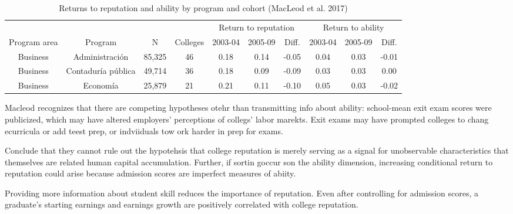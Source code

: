 \documentclass[a4paper, 11pt]{article}
\begin{document}
\begin{table}[h!]
 \begin{adjustwidth}{-.75in}{-.75in} 
 \begin{center}
 \caption{Returns to reputation and ability by program and cohort (MacLeod et al. 2017)}
 \vspace{8pt}
\begin{tabular}{cccccccccc}
\toprule
             &                    &        &          & \multicolumn{3}{c}{Return to reputation}&\multicolumn{3}{c}{Return to ability}       \\
             \cmidrule(lr){5-7} \cmidrule(lr){8-10}
Program area & Program            & N      & Colleges & 2003-04              & 2005-09 & Diff. & 2003-04           & 2005-09 & Diff. \\
\midrule
Business     & Administraci\'on     & 85,325 & 46       & 0.18                 & 0.14    & -0.05 & 0.04              & 0.03    & -0.01 \\
Business     & Contadur\'ia p\'ublica & 49,714 & 36       & 0.18                 & 0.09    & -0.09 & 0.03              & 0.03    & 0.00  \\
Business     & Econom\'ia           & 25,879 & 21       & 0.21                 & 0.11    & -0.10 & 0.05              & 0.03    & -0.02 \\
\bottomrule
\end{tabular}
\label{tab:macleod}
\end{center}
\end{adjustwidth}
\end{table}


Macleod recognizes that there are competing hypotheses otehr than transmitting info about ability:
 school-mean exit exam scores were publicized, which may have altered employers' perceptions of collegs' labor marekts. Exit exams may have prompted colleges to chang ecurricula or add teest prep, or indviiduals tow ork harder in prep for exams. 
 

 
 Conclude that they cannot rule out the hypotehsis that college reputation is merely serving as a signal for unobservable characteristics that themselves are related human capital accumulation.  Further, if sortin goccur son the ability dimension, increasing conditional return to reputation could arise because admission scores are imperfect measures of abiity. 
 
 Providing more information about student skill reduces the importance of reputation.  Even after controlling for admission scores, a graduate's starting earnings and earnings growth are positively correlated with college reputation. 
\end{document}

